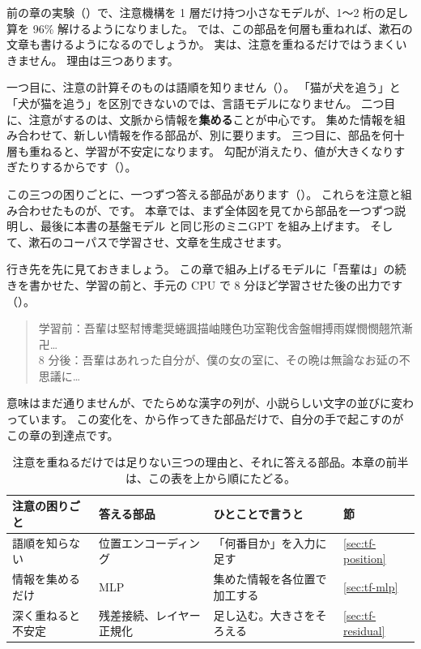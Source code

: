 前の章の実験（）で、注意機構を 1 層だけ持つ小さなモデルが、1〜2 桁の足し算を 96\% 解けるようになりました。
では、この部品を何層も重ねれば、漱石の文章も書けるようになるのでしょうか。
実は、注意を重ねるだけではうまくいきません。
理由は三つあります。

一つ目に、注意の計算そのものは語順を知りません（）。
「猫が犬を追う」と「犬が猫を追う」を区別できないのでは、言語モデルになりません。
二つ目に、注意がするのは、文脈から情報を\textbf{集める}ことが中心です。
集めた情報を組み合わせて、新しい情報を作る部品が、別に要ります。
三つ目に、部品を何十層も重ねると、学習が不安定になります。
勾配が消えたり、値が大きくなりすぎたりするからです（）。

この三つの困りごとに、一つずつ答える部品があります（）。
これらを注意と組み合わせたものが、\cite{vaswani2017attention}です。
本章では、まず全体図を見てから部品を一つずつ説明し、最後に本書の基盤モデル  と同じ形のミニGPT を組み上げます。
そして、漱石のコーパスで学習させ、文章を生成させます。

行き先を先に見ておきましょう。
この章で組み上げるモデルに「吾輩は」の続きを書かせた、学習の前と、手元の CPU で 8 分ほど学習させた後の出力です（）。
\begin{quote}
学習前：吾輩は堅幇博耄奨蜷諷描岫賤色功室鞄伐舎盤帽搏雨媒憫憫翹笊漸卍…\\
8 分後：吾輩はあれった自分が、僕の女の室に、その晩は無論なお延の不思議に…
\end{quote}
意味はまだ通りませんが、でたらめな漢字の列が、小説らしい文字の並びに変わっています。
この変化を、から作ってきた部品だけで、自分の手で起こすのがこの章の到達点です。

\begin{table}[tbp]
\centering
\caption{注意を重ねるだけでは足りない三つの理由と、それに答える部品。本章の前半は、この表を上から順にたどる。}
\label{tab:tf-three}
\small
\begin{tabular}{llll}
\toprule
注意の困りごと & 答える部品 & ひとことで言うと & 節 \\
\midrule
語順を知らない & 位置エンコーディング & 「何番目か」を入力に足す & \ref{sec:tf-position} \\
情報を集めるだけ & MLP & 集めた情報を各位置で加工する & \ref{sec:tf-mlp} \\
深く重ねると不安定 & 残差接続、レイヤー正規化 & 足し込む。大きさをそろえる & \ref{sec:tf-residual} \\
\bottomrule
\end{tabular}
\end{table}

